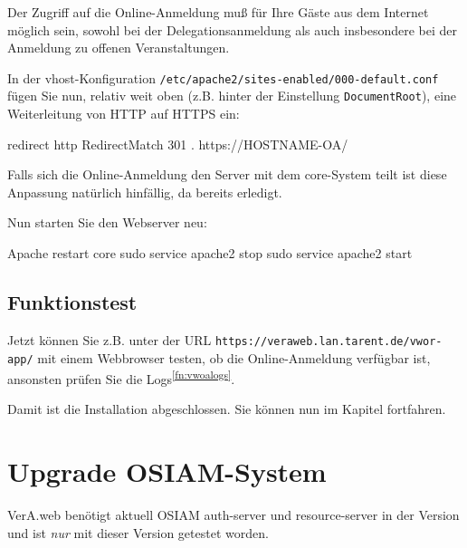 Der Zugriff auf die Online-Anmeldung muß für Ihre Gäste aus dem Internet
möglich sein, sowohl bei der Delegationsanmeldung als auch insbesondere
bei der Anmeldung zu offenen Veranstaltungen.

\begin{minipage}{\linewidth}
In der vhost-Konfiguration \texttt{/etc/apache2/sites-enabled/000-default.conf}
fügen Sie nun, relativ weit oben (z.B. hinter der Einstellung
\texttt{DocumentRoot}), eine Weiterleitung von HTTP auf HTTPS ein:

\begin{lstdump}{redirect http}
RedirectMatch 301 . https://HOSTNAME-OA/
\end{lstdump}
\end{minipage}

Falls sich die Online-Anmeldung den Server mit dem core-System teilt ist
diese Anpassung natürlich hinfällig, da bereits erledigt.

\begin{minipage}{\linewidth}
Nun starten Sie den Webserver neu:

\begin{lstdump}{Apache restart core}
sudo service apache2 stop
sudo service apache2 start
\end{lstdump}
\end{minipage}

\subsection{Funktionstest}\label{subsec:setup-oa-check}

Jetzt können Sie \dash z.B. unter der URL
\texttt{https://veraweb.lan.tarent.de/vwor-app/} \dash mit einem
Webbrowser testen, ob die Online-Anmeldung verfügbar ist, ansonsten
prüfen Sie die Logs\Hair\textsuperscript{\ref{fn:vwoalogs}}.

\fi%

Damit ist die Installation abgeschlossen.
Sie können nun im Kapitel  fortfahren.

\newpage

\ifoa

\section{Upgrade OSIAM-System}\label{sec:upgrade-osiam}

VerA.web benötigt aktuell OSIAM auth-server und resource-server in
der Version \vwiaversosiam{} und ist \emph{nur} mit dieser Version
getestet worden.\keinumbruch

